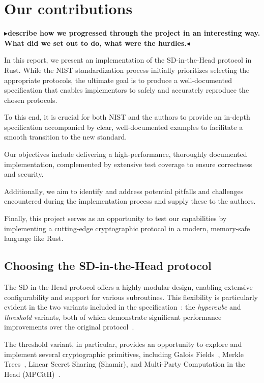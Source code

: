 \documentclass[twoside,11pt,openright]{report}
\theoremstyle{definition}
\theoremstyle{plain}
\newcommand{\todo}[1]{{\color[rgb]{.5,0,0}\textbf{$\blacktriangleright$#1$\blacktriangleleft$}}}
\begin{document}
\section{Our contributions}

\todo{describe how we progressed through the project in an interesting way. What did we set out to do, what were the hurdles.}

In this report, we present an implementation of the SD-in-the-Head protocol in Rust. While the NIST standardization process initially prioritizes selecting the appropriate protocols, the ultimate goal is to produce a well-documented specification that enables implementors to safely and accurately reproduce the chosen protocols.

To this end, it is crucial for both NIST and the authors to provide an in-depth specification accompanied by clear, well-documented examples to facilitate a smooth transition to the new standard.

Our objectives include delivering a high-performance, thoroughly documented implementation, complemented by extensive test coverage to ensure correctness and security.

Additionally, we aim to identify and address potential pitfalls and challenges encountered during the implementation process and supply these to the authors.

Finally, this project serves as an opportunity to test our capabilities by implementing a cutting-edge cryptographic protocol in a modern, memory-safe language like Rust.

\subsection{Choosing the SD-in-the-Head protocol}
The SD-in-the-Head protocol offers a highly modular design, enabling extensive configurability and support for various subroutines. This flexibility is particularly evident in the two variants included in the specification~\cite{aguilarsyndrome11}: the \textit{hypercube} and \textit{threshold} variants, both of which demonstrate significant performance improvements over the original protocol~\cite{feneuil2022syndrome,aguilar2023return,feneuil2023threshold}.

The threshold variant, in particular, provides an opportunity to explore and implement several cryptographic primitives, including Galois Fields~\cite{brownadvanced}, Merkle Trees~\cite{becker2008merkle}, Linear Secret Sharing (Shamir), and Multi-Party Computation in the Head (MPCitH)~\cite{baum2020concretely}.
\end{document}
